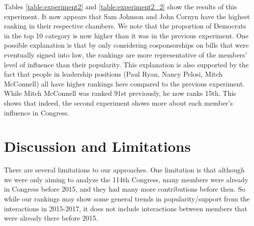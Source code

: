 \documentclass[11pt]{article}
\begin{document}
Tables \ref{table:experiment2} and \ref{table:experiment2_2} show the results of this experiment. It now appears that Sam Johnson and John Cornyn have the highest ranking in their respective chambers. We note that the proportion of Democrats in the top 10 category is now higher than it was in the previous experiment. One possible explanation is that by only considering cosponsorships on bills that were eventually signed into law, the rankings are more representative of the members' level of influence than their popularity. This explanation is also supported by the fact that people in leadership positions (Paul Ryan, Nancy Pelosi, Mitch McConnell) all have higher rankings here compared to the previous experiment. While Mitch McConnell was ranked 91st previously, he now ranks 15th. This shows that indeed, the second experiment shows more about each member's influence in Congress. 
 
 
 
 
 
 
 
 
 
 
 
 
 
 
 

\pagebreak















\section*{Discussion and Limitations}
There are several limitations to our approaches. One limitation is that although we were only aiming to analyze the 114th Congress, many members were already in Congress before 2015, and they had many more contributions before then. So while our rankings may show some general trends in popularity/support from the interactions in 2015-2017, it does not include interactions between members that were already there before 2015.
\end{document}
